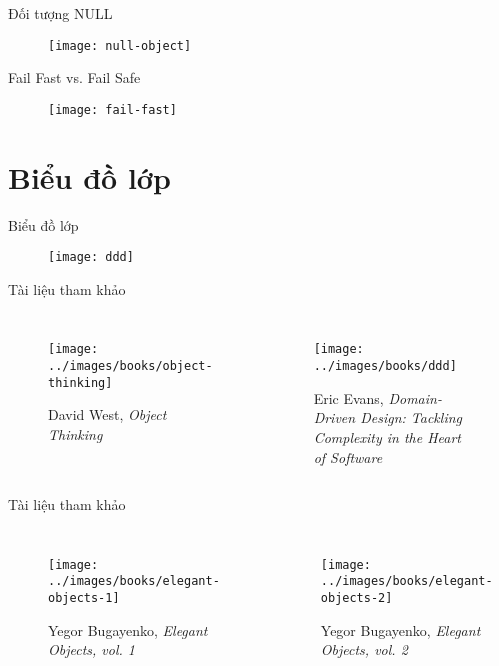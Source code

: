 \documentclass{beamer}
\begin{document}
\begin{frame}{Đối tượng NULL}
    \begin{figure}
        \centering
        \texttt{[image: null-object]}
    \end{figure}
\end{frame}

\begin{frame}{Fail Fast vs. Fail Safe}
    \begin{figure}
        \centering
        \texttt{[image: fail-fast]}
    \end{figure}
    \centering{}
\end{frame}

\section{Biểu đồ lớp}

\begin{frame}{Biểu đồ lớp}
    \begin{figure}
        \centering
        \texttt{[image: ddd]}
    \end{figure}
\end{frame}

\begin{frame}{Tài liệu tham khảo}
    \begin{columns}
        \begin{figure}
            \centering
            \texttt{[image: ../images/books/object-thinking]}
            \caption{David West, \emph{Object Thinking}}
        \end{figure}
        \begin{figure}
            \centering
            \texttt{[image: ../images/books/ddd]}
            \caption{Eric Evans,
            \emph{Domain-Driven Design: Tackling Complexity in the Heart of Software}}
        \end{figure}
    \end{columns}
\end{frame}

\begin{frame}{Tài liệu tham khảo}
    \begin{columns}
        \begin{figure}
            \centering
            \texttt{[image: ../images/books/elegant-objects-1]}
            \caption{Yegor Bugayenko, \emph{Elegant Objects, vol. 1}}
        \end{figure}
        \begin{figure}
            \centering
            \texttt{[image: ../images/books/elegant-objects-2]}
            \caption{Yegor Bugayenko, \emph{Elegant Objects, vol. 2}}
        \end{figure}
    \end{columns}
\end{frame}
\end{document}
